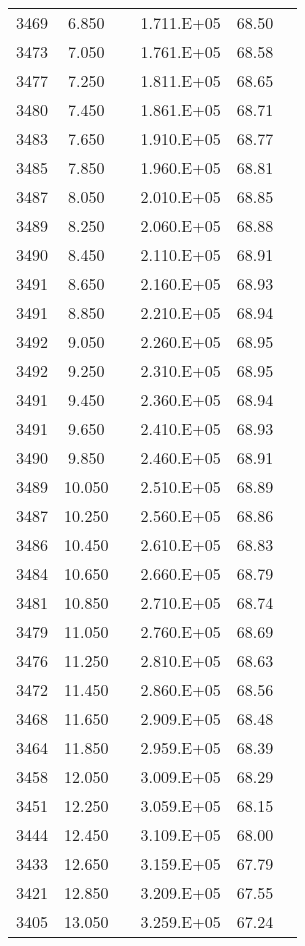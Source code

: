 \begin{longtable}{cccccc}
3469 & 6.850 &  & 1.711.E+05 & 68.50 &  \\
3473 & 7.050 &  & 1.761.E+05 & 68.58 &  \\
3477 & 7.250 &  & 1.811.E+05 & 68.65 &  \\
3480 & 7.450 &  & 1.861.E+05 & 68.71 &  \\
3483 & 7.650 &  & 1.910.E+05 & 68.77 &  \\
3485 & 7.850 &  & 1.960.E+05 & 68.81 &  \\
3487 & 8.050 &  & 2.010.E+05 & 68.85 &  \\
3489 & 8.250 &  & 2.060.E+05 & 68.88 &  \\
3490 & 8.450 &  & 2.110.E+05 & 68.91 &  \\
3491 & 8.650 &  & 2.160.E+05 & 68.93 &  \\
3491 & 8.850 &  & 2.210.E+05 & 68.94 &  \\
3492 & 9.050 &  & 2.260.E+05 & 68.95 &  \\
3492 & 9.250 &  & 2.310.E+05 & 68.95 &  \\
3491 & 9.450 &  & 2.360.E+05 & 68.94 &  \\
3491 & 9.650 &  & 2.410.E+05 & 68.93 &  \\
3490 & 9.850 &  & 2.460.E+05 & 68.91 &  \\
3489 & 10.050 &  & 2.510.E+05 & 68.89 &  \\
3487 & 10.250 &  & 2.560.E+05 & 68.86 &  \\
3486 & 10.450 &  & 2.610.E+05 & 68.83 &  \\
3484 & 10.650 &  & 2.660.E+05 & 68.79 &  \\
3481 & 10.850 &  & 2.710.E+05 & 68.74 &  \\
3479 & 11.050 &  & 2.760.E+05 & 68.69 &  \\
3476 & 11.250 &  & 2.810.E+05 & 68.63 &  \\
3472 & 11.450 &  & 2.860.E+05 & 68.56 &  \\
3468 & 11.650 &  & 2.909.E+05 & 68.48 &  \\
3464 & 11.850 &  & 2.959.E+05 & 68.39 &  \\
3458 & 12.050 &  & 3.009.E+05 & 68.29 &  \\
3451 & 12.250 &  & 3.059.E+05 & 68.15 &  \\
3444 & 12.450 &  & 3.109.E+05 & 68.00 &  \\
3433 & 12.650 &  & 3.159.E+05 & 67.79 &  \\
3421 & 12.850 &  & 3.209.E+05 & 67.55 &  \\
3405 & 13.050 &  & 3.259.E+05 & 67.24 &  \\

\end{longtable}
